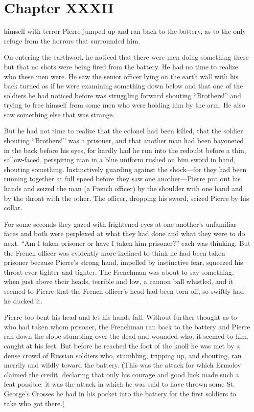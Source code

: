 \chapter*{Chapter XXXII} \ifaudio {}
\fi

 himself with terror Pierre jumped up and ran back to the
battery, as to the only refuge from the horrors that surrounded
him.

On entering the earthwork he noticed that there were men doing
something there but that no shots were being fired from the
battery. He had no time to realize who these men were. He saw the
senior officer lying on the earth wall with his back turned as if
he were examining something down below and that one of the
soldiers he had noticed before was struggling forward shouting
``Brothers!'' and trying to free himself from some men who were
holding him by the arm. He also saw something else that was
strange.

But he had not time to realize that the colonel had been killed,
that the soldier shouting ``Brothers!'' was a prisoner, and that
another man had been bayoneted in the back before his eyes, for
hardly had he run into the redoubt before a thin, sallow-faced,
perspiring man in a blue uniform rushed on him sword in hand,
shouting something. Instinctively guarding against the
shock---for they had been running together at full speed before
they saw one another---Pierre put out his hands and seized the
man (a French officer) by the shoulder with one hand and by the
throat with the other. The officer, dropping his sword, seized
Pierre by his collar.

For some seconds they gazed with frightened eyes at one another's
unfamiliar faces and both were perplexed at what they had done
and what they were to do next. ``Am I taken prisoner or have I
taken him prisoner?'' each was thinking. But the French officer
was evidently more inclined to think he had been taken prisoner
because Pierre's strong hand, impelled by instinctive fear,
squeezed his throat ever tighter and tighter. The Frenchman was
about to say something, when just above their heads, terrible and
low, a cannon ball whistled, and it seemed to Pierre that the
French officer's head had been torn off, so swiftly had he ducked
it.

Pierre too bent his head and let his hands fall. Without further
thought as to who had taken whom prisoner, the Frenchman ran back
to the battery and Pierre ran down the slope stumbling over the
dead and wounded who, it seemed to him, caught at his feet. But
before he reached the foot of the knoll he was met by a dense
crowd of Russian soldiers who, stumbling, tripping up, and
shouting, ran merrily and wildly toward the battery. (This was
the attack for which Ermolov claimed the credit, declaring that
only his courage and good luck made such a feat possible: it was
the attack in which he was said to have thrown some St. George's
Crosses he had in his pocket into the battery for the first
soldiers to take who got there.)

